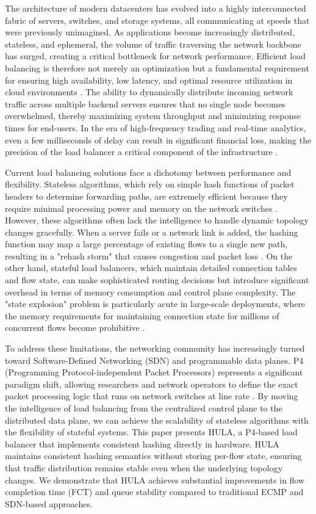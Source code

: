 \documentclass[12pt,a4paper]{article}
\begin{document}
The architecture of modern datacenters has evolved into a highly interconnected fabric of servers, switches, and storage systems, all communicating at speeds that were previously unimagined. As applications become increasingly distributed, stateless, and ephemeral, the volume of traffic traversing the network backbone has surged, creating a critical bottleneck for network performance. Efficient load balancing is therefore not merely an optimization but a fundamental requirement for ensuring high availability, low latency, and optimal resource utilization in cloud environments \cite{ref4}. The ability to dynamically distribute incoming network traffic across multiple backend servers ensures that no single node becomes overwhelmed, thereby maximizing system throughput and minimizing response times for end-users. In the era of high-frequency trading and real-time analytics, even a few milliseconds of delay can result in significant financial loss, making the precision of the load balancer a critical component of the infrastructure \cite{ref5}.

Current load balancing solutions face a dichotomy between performance and flexibility. Stateless algorithms, which rely on simple hash functions of packet headers to determine forwarding paths, are extremely efficient because they require minimal processing power and memory on the network switches \cite{ref6}. However, these algorithms often lack the intelligence to handle dynamic topology changes gracefully. When a server fails or a network link is added, the hashing function may map a large percentage of existing flows to a single new path, resulting in a "rehash storm" that causes congestion and packet loss \cite{ref7}. On the other hand, stateful load balancers, which maintain detailed connection tables and flow state, can make sophisticated routing decisions but introduce significant overhead in terms of memory consumption and control plane complexity. The "state explosion" problem is particularly acute in large-scale deployments, where the memory requirements for maintaining connection state for millions of concurrent flows become prohibitive \cite{ref8}.

To address these limitations, the networking community has increasingly turned toward Software-Defined Networking (SDN) and programmable data planes. P4 (Programming Protocol-independent Packet Processors) represents a significant paradigm shift, allowing researchers and network operators to define the exact packet processing logic that runs on network switches at line rate \cite{ref9}. By moving the intelligence of load balancing from the centralized control plane to the distributed data plane, we can achieve the scalability of stateless algorithms with the flexibility of stateful systems. This paper presents HULA, a P4-based load balancer that implements consistent hashing directly in hardware. HULA maintains consistent hashing semantics without storing per-flow state, ensuring that traffic distribution remains stable even when the underlying topology changes. We demonstrate that HULA achieves substantial improvements in flow completion time (FCT) and queue stability compared to traditional ECMP and SDN-based approaches.
\end{document}
